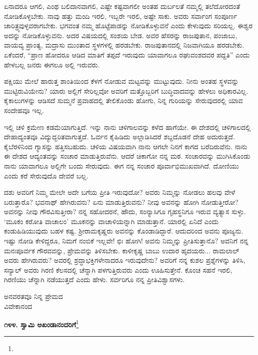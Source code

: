 ಏನಾದರೂ ಆಗಲಿ, ಎಂಥ ಬಲಿದಾನವಾಗಲಿ, ಎಷ್ಟೇ ಕಷ್ಟವಾಗಲೀ ಅಂತಹ ದುರ್ಬಲತೆ ನಮ್ಮಲ್ಲಿ ತಲೆದೋರದಂತೆ ನೋಡಿಕೊಳ್ಳಬೇಕು. ನಾವು ಹತ್ತು ಮಂದಿ ಇರಲಿ, ಇಬ್ಬರೇ ಇರಲಿ, ಅಷ್ಟೇ ಸಾಕು. ಅವರು ಸರ್ವಾಂಗ ಸಂಪೂರ್ಣ ಚಾರಿತ್ರ್ಯವುಳ್ಳವರಾಗಬೇಕು. ಭಗವಂತ ನಮ್ಮ ಹೊಟ್ಟೆಪಾಡನ್ನು ನೋಡಿಕೊಳ್ಳುವನೆ ಎಂದು ಕೇಳುವುದು ಸರಿಯಲ್ಲ. ಈಶ್ವರ ಅದನ್ನು ನೋಡಿಕೊಳ್ಳುವನು. ಅದರ ವಿಷಯದಲ್ಲಿ ಸಂಶಯ ಬೇಡ. ಅವರ ಹೆಸರನ್ನು ರಾಜಪುತಾನ, ಪಂಜಾಬು, ವಾಯವ್ಯ ಪ್ರಾಂತ್ಯ, ಮದ್ರಾಸು ಮುಂತಾದ ಸ್ಥಳಗಳಲ್ಲಿ ಹರಡಬೇಕು. ರಾಜಪುತಾನದಲ್ಲಿ ನಿಜವಾಗಿಯೂ ಹರಡಬೇಕು. ಏಕೆಂದರೆ, “ಪ್ರಾಣ ಹೋದರೂ ಆಡಿದ ಮಾತಿಗೆ ತಪ್ಪದೆ ಇರುವುದು ಯಾವಾಗಲೂ ರಘುವಂಶದವರ ಪದ್ದತಿ” ಎಂದು ಹೇಳಬಲ್ಲ ಜನರು ಈಗಲೂ ಅಲ್ಲಿ ಇರುವರು.

ಪಕ್ಷಿಯು ಮೇಲೆ ಹಾರುತ್ತ ಶಾಂತಿಯಿಂದ ಕೆಳಗೆ ನೋಡುವ ಮಟ್ಟವನ್ನು ಮುಟ್ಟುವುದು. ನೀನು ಅಂತಹ ಸ್ಥಳವನ್ನು ಮುಟ್ಟಿರುವಿಯೇನು? ಯಾರು ಅಲ್ಲಿಗೆ ಸೇರಿಲ್ಲವೋ ಅವರಿಗೆ ಮತ್ತೊಬ್ಬರಿಗೆ ಬುದ್ಧಿವಾದವನ್ನು ಹೇಳಲು ಅಧಿಕಾರವಿಲ್ಲ. ಕೈಕಾಲುಗಳನ್ನು ಆಡಿಸದೆ ಸುಮ್ಮನೆ ಪ್ರವಾಹದಲ್ಲಿ ತೇಲಿಕೊಂಡು ಹೋಗು, ನಿನ್ನ ಗುರಿಯನ್ನು ಸೇರುವುದರಲ್ಲಿ ಯಾವ ಸಂದೇಹವೂ ಇಲ್ಲ.

ಇಲ್ಲಿ ಚಳಿ ಕ್ರಮೇಣ ಕಡಮೆಯಾಗುತ್ತಿದೆ. ಇನ್ನು ನಾನು ಚಳಿಗಾಲವನ್ನು ಕಳೆದ ಹಾಗೆಯೇ. ಈ ದೇಶದಲ್ಲಿ ಚಳಿಗಾಲದಲ್ಲಿ ದೇಹಾದ್ಯಂತವೂ ವಿದ್ಯುದ್ಭರಿತವಾಗುತ್ತದೆ. ಓರ್ವನ ಕೈಹಿಡಿದು ಅಲ್ಲಾಡಿಸಿದರೆ ಶಬ್ದದೊಡನೆ ದೇಹ ಅದುರುತ್ತದೆ. ಕೈಬೆರಳಿನಿಂದ ಗ್ಯಾಸನ್ನು ಹತ್ತಿಸಬಹುದು. ಚಳಿಯ ವಿಷಯವಾಗಿ ನಾನು ಆಗಲೇ ನಿನಗೆ ಕಾಗದ ಬರೆದಿರುವೆನು. ನಾನು ಈ ದೇಶದ ಆದ್ಯಂತವನ್ನು ಸಂಚಾರ ಮಾಡುತ್ತಿರುವೆನು. ಆದರೆ ಚಿಕಾಗೋ ನನ್ನ ಮಠ. ಸಂಚಾರವನ್ನು ಮುಗಿಸಿಕೊಂಡು ನಾನು ಯಾವಾಗಲೂ ಅಲ್ಲಿಗೇ ಬಂದು ಸೇರುವುದು. ಈಗ ನನ್ನ ಸಂಚಾರ ಪೂರ್ವಾಭಿಮುಖವಾಗಿದೆ. ದೋಣಿಯು ಎಂದು ಕರೆ ಸೇರುವುದೊ ದೇವರೆ ಬಲ್ಲ.

ದಶು ಅವರಿಗೆ ನಿಮ್ಮ ಮೇಲೇ ಅದೇ ಬಗೆಯ ಪ್ರೀತಿ ಇರುವುದೋ? ಅವರು ನಿಮ್ಮನ್ನು ನೋಡಲು ಹಲವು ವೇಳೆ ಬರುತ್ತಾರೊ? ಭವನಾಥ್ ಹೇಗಿರುವನು? ಏನು ಮಾಡುತ್ತಿರುವನು? ನೀವು ಅವನನ್ನು ಹೋಗಿ ನೋಡುತ್ತೀರೋ? ಅವನನ್ನು ನೀವು ಗೌರವಿಸುತ್ತೀರಾ? ನನ್ನ ಸಹೋದರನೆ, ಹೌದು, ಸಂನ್ಯಾಸಿಗೂ ಗೃಹಸ್ಥನಿಗೂ ಇರುವ ವ್ಯತ್ಯಾಸ ಸುಳ್ಳು. ‘ಮೂಕಂ ಕರೋತಿ ವಾಚಾಲಂ’ ಮೂಕನನ್ನು ವಾಚಾಳಿಯನ್ನಾಗಿ ಮಾಡುತ್ತಾನೆ. ಯಾರಲ್ಲಿ ಏನಿದೆ ಎಂದು ಕಂಡುಹಿಡಿಯುವುದು ಬಹಳ ಕಷ್ಟ. ಶ‍್ರೀರಾಮಕೃಷ್ಣರು ಅವನನ್ನು ಕೊಂಡಾಡಿದ್ದಾರೆ. ಆದುದರಿಂದ ಅವನು ಪೂಜ್ಯನು. ಇಷ್ಟು ನೋಡಿ ಕೇಳಿದ್ದರೂ, ನಿಮಗೆ ನಂಬಿಕೆ ಇಲ್ಲವೇ! ಛಿಃ ಹೋಗಿ! ಅವನು ನಿಮ್ಮನ್ನು ಪ್ರೀತಿಸುತ್ತಾನೊ? ಅವನಿಗೆ ನನ್ನ ಮನಃಪೂರ್ವಕ ಗೌರವವನ್ನು, ಪ್ರೇಮವನ್ನು ತಿಳಿಸಬೇಕು. ಕಾಳೀಕೃಷ್ಣ ಬಾಬು ಉದಾರ ಹೃದಯರು... ರಾಮಲಾಲ್ ಅವರು ಹೇಗಿರುವರು? ಅವರಲ್ಲಿ ಶ್ರದ್ಧಾಭಕ್ತಿಗಳೇನಾದರೂ ಇರುವುದೇನು? ಅವರಿಗೆ ನನ್ನ ಕುಶಲ ಪ್ರಶ್ನೆಗಳನ್ನು ತಿಳಿಸಿ, ಸನ್ಯಾಲ್ ಅವರು ಗಿರಣಿ ಕೆಲಸದಲ್ಲಿ ಚೆನ್ನಾಗಿ ಪಳಗುತ್ತಿರುವರು ಎಂದು ಊಹಿಸುತ್ತೇನೆ. ಕೊಂಚ ಸಹನೆ ಇರಲಿ, ಗಿರಣಿಯು ಚೆನ್ನಾಗಿ ನಡೆಯುತ್ತದೆ ಎಂದು ಹೇಳು. ಸರ್ವರಿಗೂ ನನ್ನ ಪ್ರೀತಿವಿಶ್ವಾಸಗಳು.

{\flushright
ಅನವರತವೂ ನಿನ್ನ ಪ್ರೇಮದ\\ವಿವೇಕಾನಂದ\par}

\begin{center}
\textbf{೧೪೪. ಸ್ವಾಮಿ ಅಖಂಡಾನಂದರಿಗೆ}\footnote{}
\end{center}

